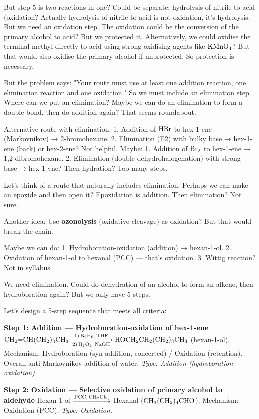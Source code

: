 \documentclass[11pt]{article}
\begin{document}
\begin{corrige}
But step 5 is two reactions in one? Could be separate: hydrolysis of nitrile to acid (oxidation? Actually hydrolysis of nitrile to acid is not oxidation, it's hydrolysis. But we need an oxidation step. The oxidation could be the conversion of the primary alcohol to acid? But we protected it. Alternatively, we could oxidise the terminal methyl directly to acid using strong oxidising agents like \(\ce{KMnO4}\)? But that would also oxidise the primary alcohol if unprotected. So protection is necessary.

But the problem says: "Your route must use at least one addition reaction, one elimination reaction and one oxidation." So we must include an elimination step. Where can we put an elimination? Maybe we can do an elimination to form a double bond, then do addition again? That seems roundabout.

Alternative route with elimination:
1. Addition of \(\ce{HBr}\) to hex-1-ene (Markovnikov) → 2-bromohexane.
2. Elimination (E2) with bulky base → hex-1-ene (back) or hex-2-ene? Not helpful.
Maybe: 
1. Addition of \(\ce{Br2}\) to hex-1-ene → 1,2-dibromohexane.
2. Elimination (double dehydrohalogenation) with strong base → hex-1-yne? Then hydration? Too many steps.

Let's think of a route that naturally includes elimination. Perhaps we can make an epoxide and then open it? Epoxidation is addition. Then elimination? Not sure.

Another idea: Use \textbf{ozonolysis} (oxidative cleavage) as oxidation? But that would break the chain.

Maybe we can do:
1. Hydroboration-oxidation (addition) → hexan-1-ol.
2. Oxidation of hexan-1-ol to hexanal (PCC) — that's oxidation.
3. Wittig reaction? Not in syllabus.

We need elimination. Could do dehydration of an alcohol to form an alkene, then hydroboration again? But we only have 5 steps.

Let's design a 5-step sequence that meets all criteria:

\textbf{Step 1: Addition — Hydroboration-oxidation of hex-1-ene}
\(\ce{CH2=CH(CH2)3CH3 ->[1) B2H6, THF][2) H2O2, NaOH] HOCH2CH2(CH2)3CH3}\) (hexan-1-ol).
Mechanism: Hydroboration (syn addition, concerted) / Oxidation (retention). Overall anti-Markovnikov addition of water. \textit{Type: Addition (hydroboration-oxidation).}

\textbf{Step 2: Oxidation — Selective oxidation of primary alcohol to aldehyde}
Hexan-1-ol \(\xrightarrow{\ce{PCC, CH2Cl2}}\) Hexanal (\(\ce{CH3(CH2)4CHO}\)).
Mechanism: Oxidation (PCC). \textit{Type: Oxidation.}


\end{corrige}
\end{document}

